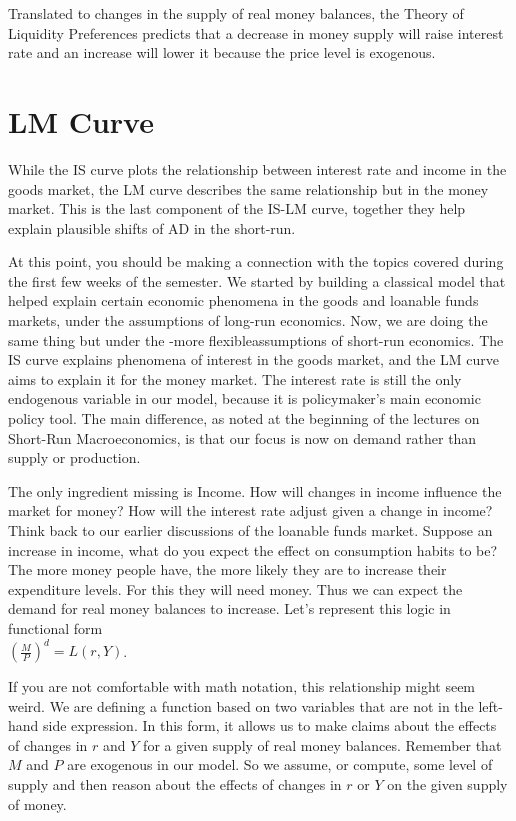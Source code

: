 \documentclass[10pt]{article}
\begin{document}
Translated to changes in the supply of real money balances, the Theory of Liquidity Preferences predicts that a decrease in money supply will raise interest rate and an increase will lower it because the price level is exogenous.

\section*{LM Curve}
While the IS curve plots the relationship between interest rate and income in the goods market, the LM curve describes the same relationship but in the money market. This is the last component of the IS-LM curve, together they help explain plausible shifts of AD in the short-run.

At this point, you should be making a connection with the topics covered during the first few weeks of the semester. We started by building a classical model that helped explain certain economic phenomena in the goods and loanable funds markets, under the assumptions of long-run economics. Now, we are doing the same thing but under the -more flexibleassumptions of short-run economics. The IS curve explains phenomena of interest in the goods market, and the LM curve aims to explain it for the money market. The interest rate is still the only endogenous variable in our model, because it is policymaker's main economic policy tool. The main difference, as noted at the beginning of the lectures on Short-Run Macroeconomics, is that our focus is now on demand rather than supply or production.

The only ingredient missing is Income. How will changes in income influence the market for money? How will the interest rate adjust given a change in income? Think back to our earlier discussions of the loanable funds market. Suppose an increase in income, what do you expect the effect on consumption habits to be? The more money people have, the more likely they are to increase their expenditure levels. For this they will need money. Thus we can expect the demand for real money balances to increase. Let's represent this logic in functional form\\
$\left(\frac{M}{P}\right)^{d}=L(r, Y)$.

If you are not comfortable with math notation, this relationship might seem weird. We are defining a function based on two variables that are not in the left-hand side expression. In this form, it allows us to make claims about the effects of changes in $r$ and $Y$ for a given supply of real money balances. Remember that $M$ and $P$ are exogenous in our model. So we assume, or compute, some level of supply and then reason about the effects of changes in $r$ or $Y$ on the given supply of money.
\end{document}
